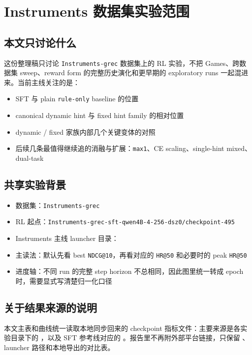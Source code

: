 \section{Instruments 数据集实验范围}

\subsection{本文只讨论什么}

这份整理稿只讨论 \texttt{Instruments-grec} 数据集上的 RL 实验，不把 Games、跨数据集 sweep、reward form 的完整历史演化和更早期的 exploratory runs 一起混进来。当前主线关注的是：

\begin{itemize}
\item SFT 与 plain \texttt{rule-only} baseline 的位置
\item canonical dynamic hint 与 fixed hint family 的相对位置
\item dynamic / fixed 家族内部几个关键变体的对照
\item 后续几条最值得继续追的消融与扩展：\texttt{max1}、CE scaling、single-hint mixed、dual-task
\end{itemize}

\subsection{共享实验背景}

\begin{itemize}
\item 数据集：\texttt{Instruments-grec}
\item RL 起点：\texttt{Instruments-grec-sft-qwen4B-4-256-dsz0/checkpoint-495}
\item Instruments 主线 launcher 目录：
\item 主读法：默认先看 best \texttt{NDCG@10}，再看对应的 \texttt{HR@50} 和必要时的 peak \texttt{HR@50}
\item 进度轴：不同 run 的完整 step horizon 不总相同，因此图里统一转成 epoch 时，需要显式写清楚归一化口径
\end{itemize}

\subsection{关于结果来源的说明}

本文主表和曲线统一读取本地同步回来的 checkpoint 指标文件：主要来源是各实验目录下的 ，以及 SFT 参考线对应的 。报告里不再附外部平台链接，只保留 、launcher 路径和本地导出的对比表。

